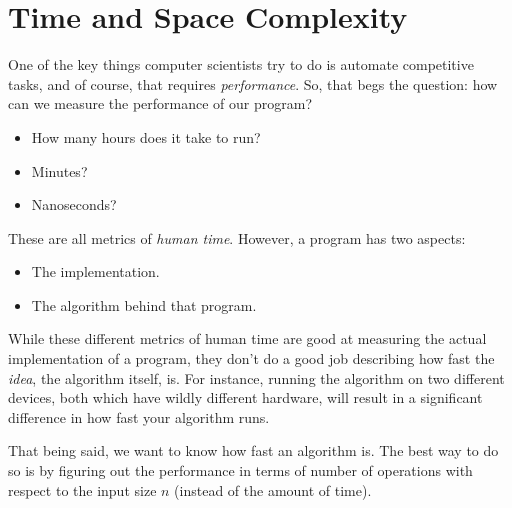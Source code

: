 \documentclass[letterpaper]{article}
\begin{document}
\newpage
\section{Time and Space Complexity}
One of the key things computer scientists try to do is automate competitive tasks, and of course, that requires \emph{performance}. So, that begs the question: how can we measure the performance of our program? 
\begin{itemize}
    \item How many hours does it take to run? 
    \item Minutes? 
    \item Nanoseconds? 
\end{itemize}
These are all metrics of \emph{human time}. However, a program has two aspects: 
\begin{itemize}
    \item The implementation. 
    \item The algorithm behind that program. 
\end{itemize}
While these different metrics of human time are good at measuring the actual implementation of a program, they don't do a good job describing how fast the \emph{idea}, the algorithm itself, is. For instance, running the algorithm on two different devices, both which have wildly different hardware, will result in a significant difference in how fast your algorithm runs. 

\bigskip 

That being said, we want to know how fast an algorithm is. The best way to do so is by figuring out the performance in terms of number of operations with respect to the input size $n$ (instead of the amount of time). 
\end{document}
